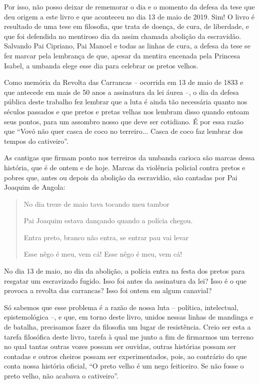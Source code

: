 Por isso, não posso deixar de rememorar o dia e o momento da defesa da
tese que deu origem a este livro e que aconteceu no dia 13 de maio de
2019. Sim! O livro é resultado de uma tese em filosofia, que trata de
doença, de cura, de liberdade, e que foi defendida no mentiroso dia da
assim chamada abolição da escravidão. Salvando Pai Cipriano, Pai Manoel
e todas as linhas de cura, a defesa da tese se fez marcar pela lembrança
de que, apesar da mentira encenada pela Princesa Isabel, a umbanda elege
esse dia para celebrar os pretos velhos.

Como memória da Revolta das Carrancas -- ocorrida em 13 de maio de 1833
e que antecede em mais de 50 anos a assinatura da lei áurea --, o dia da
defesa pública deste trabalho fez lembrar que a luta é ainda tão
necessária quanto nos séculos passados e que pretos e pretas velhas nos
lembram disso quando entoam seus pontos, para um assombro nosso que deve
ser cotidiano. É por essa razão que ``Vovó não quer casca de coco no
terreiro... Casca de coco faz lembrar dos tempos do cativeiro''.

As cantigas que firmam ponto nos terreiros da umbanda carioca são marcas
dessa história, que é de ontem e de hoje. Marcas da violência policial
contra pretos e pobres que, antes ou depois da abolição da escravidão,
são cantadas por Pai Joaquim de Angola:

\begin{quote}
No dia treze de maio tava tocando meu tambor

Pai Joaquim estava dançando quando a polícia chegou.

Entra preto, branco não entra, se entrar pau vai levar

Esse nêgo é meu, vem cá! Esse nêgo é meu, vem cá!
\end{quote}

No dia 13 de maio, no dia da abolição, a polícia entra na festa dos
pretos para resgatar um escravizado fugido. Isso foi antes da assinatura
da lei? Isso é o que provoca a revolta das carrancas? Isso foi ontem em
algum canavial?

Só sabemos que esse problema é a razão de nossa luta -- política,
intelectual, epistemológica --, e que, em torno deste livro, unidos
nessas linhas de mandinga e de batalha, precisamos fazer da filosofia um
lugar de resistência. Creio ser esta a tarefa filosófica deste livro,
tarefa à qual me junto a fim de firmarmos um terreno no qual tantas
outras vozes possam ser ouvidas, outras histórias possam ser contadas e
outros cheiros possam ser experimentados, pois, ao contrário do que
conta nossa história oficial, ``O preto velho é um nego feiticeiro. Se
não fosse o preto velho, não acabava o cativeiro''.

